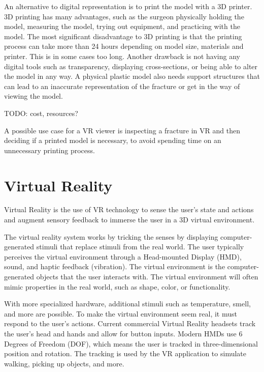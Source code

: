 \documentclass[a4paper]{report}
\begin{document}
An alternative to digital representation is to print the model with a 3D printer. 3D printing has many advantages, such as the surgeon physically holding the model, measuring the model, trying out equipment, and practicing with the model.
The most significant disadvantage to 3D printing is that the printing process can take more than 24 hours depending on model size, materials and printer. This is in some cases too long. Another drawback is not having any digital tools such as transparency, displaying cross-sections, or being able to alter the model in any way. A physical plastic model also needs support structures that can lead to an inaccurate representation of the fracture or get in the way of viewing the model.

TODO: cost, resources?

A possible use case for a VR viewer is inspecting a fracture in VR and then deciding if a printed model is necessary, to avoid spending time on an unnecessary printing process.

\section{Virtual Reality}
Virtual Reality is the use of VR technology to sense the user's state and actions and augment sensory feedback to immerse the user in a 3D virtual environment\cite{mihelj_virtual_2014}.

The virtual reality system works by tricking the senses by displaying computer-generated stimuli that replace stimuli from the real world. The user typically perceives the virtual environment through a Head-mounted Display (HMD), sound, and haptic feedback (vibration). 
The virtual environment is the computer-generated objects that the user interacts with. The virtual environment will often mimic properties in the real world, such as shape, color, or functionality.

With more specialized hardware, additional stimuli such as temperature, smell, and more are possible\cite{noauthor_feelreal_nodate}.
To make the virtual environment seem real, it must respond to the user's actions. Current commercial Virtual Reality headsets track the user's head and hands and allow for button inputs\cite{noauthor_oculus_nodate}. Modern HMDs use 6 Degrees of Freedom (DOF), which means the user is tracked in three-dimensional position and rotation\cite{lang_introduction_2013}. The tracking is used by the VR application to simulate walking, picking up objects, and more.
\end{document}
